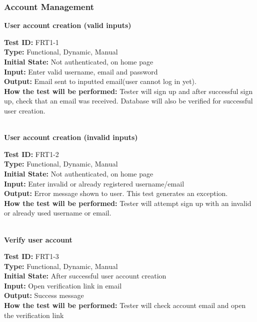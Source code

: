 \documentclass[12pt,fleqn]{article}
\begin{document}
\subsubsection{Account Management}

\textbf{User account creation (valid inputs)}
\begin{tcolorbox}
\textbf{Test ID:} FRT1-1\\
\textbf{Type:} Functional, Dynamic, Manual\\
\textbf{Initial State:} Not authenticated, on home page\\
\textbf{Input:} Enter valid username, email and password\\
\textbf{Output:} Email sent to inputted email(user cannot log in yet). \\
\textbf{How the test will be performed:} Tester will sign up and after successful sign up, check that an email was received. Database will also be verified for successful user creation.
\end{tcolorbox}

\textbf{\\User account creation (invalid inputs)}
\begin{tcolorbox}
\textbf{Test ID:} FRT1-2\\
\textbf{Type:} Functional, Dynamic, Manual\\
\textbf{Initial State:} Not authenticated, on home page\\
\textbf{Input:} Enter invalid or already registered username/email\\
\textbf{Output:} Error message shown to user.  This test generates an exception.\\
\textbf{How the test will be performed:} Tester will attempt sign up with an invalid or already used username or email.
\end{tcolorbox}

\textbf{\\Verify user account}
\begin{tcolorbox}
\textbf{Test ID:} FRT1-3\\
\textbf{Type:} Functional, Dynamic, Manual\\
\textbf{Initial State:} After successful user account creation\\
\textbf{Input:} Open verification link in email \\
\textbf{Output:} Success message \\
\textbf{How the test will be performed:} Tester will check account email and open the verification link
\end{tcolorbox}
\end{document}
